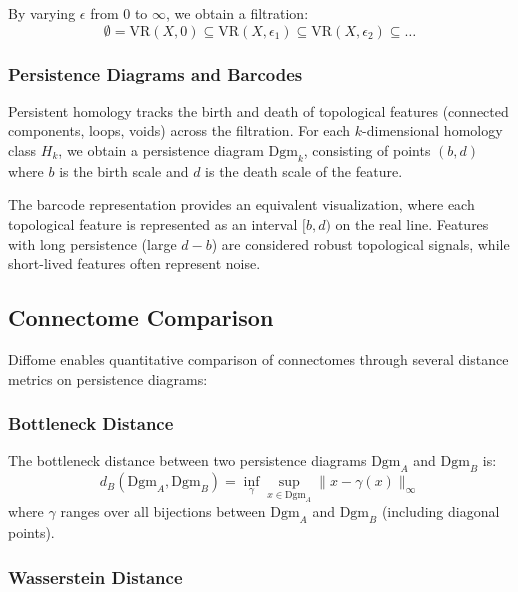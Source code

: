 \documentclass[12pt,a4paper]{article}
\begin{document}
By varying $\epsilon$ from 0 to $\infty$, we obtain a filtration:
\begin{equation}
\emptyset = \text{VR}(X, 0) \subseteq \text{VR}(X, \epsilon_1) \subseteq \text{VR}(X, \epsilon_2) \subseteq \ldots
\end{equation}

\subsubsection{Persistence Diagrams and Barcodes}

Persistent homology tracks the birth and death of topological features (connected components, loops, voids) across the filtration. For each $k$-dimensional homology class $H_k$, we obtain a persistence diagram $\text{Dgm}_k$, consisting of points $(b, d)$ where $b$ is the birth scale and $d$ is the death scale of the feature.

The barcode representation provides an equivalent visualization, where each topological feature is represented as an interval $[b, d)$ on the real line. Features with long persistence (large $d - b$) are considered robust topological signals, while short-lived features often represent noise.

\subsection{Connectome Comparison}

Diffome enables quantitative comparison of connectomes through several distance metrics on persistence diagrams:

\subsubsection{Bottleneck Distance}

The bottleneck distance between two persistence diagrams $\text{Dgm}_A$ and $\text{Dgm}_B$ is:
\begin{equation}
d_B(\text{Dgm}_A, \text{Dgm}_B) = \inf_{\gamma} \sup_{x \in \text{Dgm}_A} \|x - \gamma(x)\|_\infty
\end{equation}
where $\gamma$ ranges over all bijections between $\text{Dgm}_A$ and $\text{Dgm}_B$ (including diagonal points).

\subsubsection{Wasserstein Distance}
\end{document}
